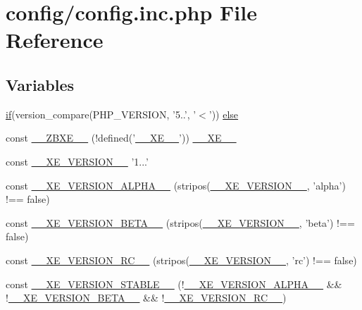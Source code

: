 \hypertarget{config_8inc_8php}{\section{config/config.inc.\+php File Reference}
\label{config_8inc_8php}
}
\subsection*{Variables}
\begin{DoxyCompactItemize}
\item 
\hyperlink{point__level__icon_8addon_8php_a29031816e50a8f742422e671b2bef9b2}{if}(version\+\_\+compare(P\+H\+P\+\_\+\+V\+E\+R\+S\+I\+O\+N, '5..', '$<$')) \hyperlink{config_8inc_8php_a249caa62ba3f93fa3cb8d963d5634fe1}{else}
\item 
const \hyperlink{config_8inc_8php_a5dee6469b95523a5bafe17e6b29c6bf7}{\+\_\+\+\_\+\+Z\+B\+X\+E\+\_\+\+\_\+} (!defined('\hyperlink{index_8php_a697de427d83b791899ae45d555377756}{\+\_\+\+\_\+\+X\+E\+\_\+\+\_\+}')) \hyperlink{index_8php_a697de427d83b791899ae45d555377756}{\+\_\+\+\_\+\+X\+E\+\_\+\+\_\+}
\item 
const \hyperlink{config_8inc_8php_afceaaec30d0e5b6a78d0ae28bcbfc8f3}{\+\_\+\+\_\+\+X\+E\+\_\+\+V\+E\+R\+S\+I\+O\+N\+\_\+\+\_\+} '1...'
\item 
const \hyperlink{config_8inc_8php_aaee982ed748e379cde978edfe8d433e1}{\+\_\+\+\_\+\+X\+E\+\_\+\+V\+E\+R\+S\+I\+O\+N\+\_\+\+A\+L\+P\+H\+A\+\_\+\+\_\+} (stripos(\hyperlink{config_8inc_8php_afceaaec30d0e5b6a78d0ae28bcbfc8f3}{\+\_\+\+\_\+\+X\+E\+\_\+\+V\+E\+R\+S\+I\+O\+N\+\_\+\+\_\+}, 'alpha') !== false)
\item 
const \hyperlink{config_8inc_8php_aac8a83557f3eab1d2d2583fe21559ca9}{\+\_\+\+\_\+\+X\+E\+\_\+\+V\+E\+R\+S\+I\+O\+N\+\_\+\+B\+E\+T\+A\+\_\+\+\_\+} (stripos(\hyperlink{config_8inc_8php_afceaaec30d0e5b6a78d0ae28bcbfc8f3}{\+\_\+\+\_\+\+X\+E\+\_\+\+V\+E\+R\+S\+I\+O\+N\+\_\+\+\_\+}, 'beta') !== false)
\item 
const \hyperlink{config_8inc_8php_a1d41a8e68af4b70491bdb523ccb57ac2}{\+\_\+\+\_\+\+X\+E\+\_\+\+V\+E\+R\+S\+I\+O\+N\+\_\+\+R\+C\+\_\+\+\_\+} (stripos(\hyperlink{config_8inc_8php_afceaaec30d0e5b6a78d0ae28bcbfc8f3}{\+\_\+\+\_\+\+X\+E\+\_\+\+V\+E\+R\+S\+I\+O\+N\+\_\+\+\_\+}, 'rc') !== false)
\item 
const \hyperlink{config_8inc_8php_ae578aaae34567264807d3f832230c1ed}{\+\_\+\+\_\+\+X\+E\+\_\+\+V\+E\+R\+S\+I\+O\+N\+\_\+\+S\+T\+A\+B\+L\+E\+\_\+\+\_\+} (!\hyperlink{config_8inc_8php_aaee982ed748e379cde978edfe8d433e1}{\+\_\+\+\_\+\+X\+E\+\_\+\+V\+E\+R\+S\+I\+O\+N\+\_\+\+A\+L\+P\+H\+A\+\_\+\+\_\+} \&\& !\hyperlink{config_8inc_8php_aac8a83557f3eab1d2d2583fe21559ca9}{\+\_\+\+\_\+\+X\+E\+\_\+\+V\+E\+R\+S\+I\+O\+N\+\_\+\+B\+E\+T\+A\+\_\+\+\_\+} \&\& !\hyperlink{config_8inc_8php_a1d41a8e68af4b70491bdb523ccb57ac2}{\+\_\+\+\_\+\+X\+E\+\_\+\+V\+E\+R\+S\+I\+O\+N\+\_\+\+R\+C\+\_\+\+\_\+})

\end{DoxyCompactItemize}
